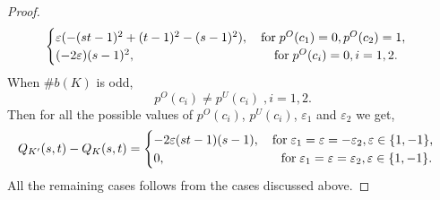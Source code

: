 \documentclass[10pt,a4paper,reqno]{amsart}
\theoremstyle{definition}
\theoremstyle{remark}
\begin{document}
\begin{proof}
$$\begin{cases}
			\varepsilon(-(st-1)^{2}+(t-1)^{2}-(s-1)^{2}),\quad \text{for} \; p^{O}(c_1)=0, p^{O}(c_2)=1,\\
			(-2\varepsilon)(s-1)^{2}, \hspace{3.9cm} \text{for} \; p^{O}(c_i)=0, i=1,2.
		\end{cases}
		$$
		 When $\# b(K)$ is odd,
		 \[p^{O}(c_i)\neq p^{U}(c_i)\; , i=1,2.\]
		Then for all the possible values of $p^{O}(c_i)$, $p^{U}(c_i)$, $\varepsilon_{1}$ and $\varepsilon_{2}$ we get,
		$$Q_{K'}(s,t)-Q_{K}(s,t)=\begin{cases}
			-2\varepsilon(st-1)(s-1), \quad \text{for} \; \varepsilon_{1}=\varepsilon=-\varepsilon_{2}, \varepsilon \in \{1,-1\},\\
			 0, \hspace{2.9cm}  \quad\text{for} \; \varepsilon_{1}=\varepsilon=\varepsilon_{2}, \varepsilon \in \{1,-1\}.
		\end{cases}	$$
		All the remaining cases follows from the cases discussed above.
	\end{proof}
\end{document}
